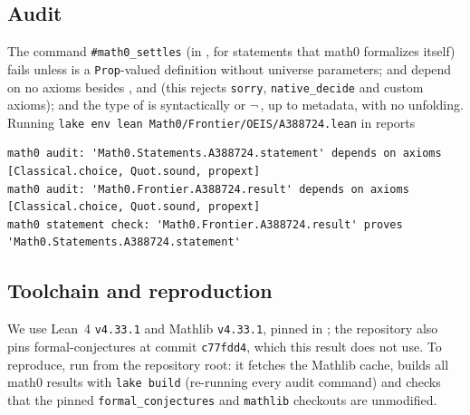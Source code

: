 \documentclass[11pt]{amsart}
\theoremstyle{plain}
\theoremstyle{definition}
\begin{document}
\subsection*{Audit}
The command \texttt{\#math0\_settles} (in , for statements that math0 formalizes itself) fails unless  is a \texttt{Prop}-valued definition without universe parameters;  and  depend on no axioms besides ,  and  (this rejects \texttt{sorry}, \texttt{native\_decide} and custom axioms); and the type of  is syntactically  or $\neg$\,, up to metadata, with no unfolding. Running \texttt{lake env lean Math0/Frontier/OEIS/A388724.lean} in  reports
\begin{lstlisting}[basicstyle=\ttfamily\scriptsize]
math0 audit: 'Math0.Statements.A388724.statement' depends on axioms [Classical.choice, Quot.sound, propext]
math0 audit: 'Math0.Frontier.A388724.result' depends on axioms [Classical.choice, Quot.sound, propext]
math0 statement check: 'Math0.Frontier.A388724.result' proves 'Math0.Statements.A388724.statement'
\end{lstlisting}

\subsection*{Toolchain and reproduction}
We use Lean~4 \cite{Lean4} \texttt{v4.33.1} and Mathlib \cite{Mathlib} \texttt{v4.33.1}, pinned in ; the repository also pins formal-conjectures \cite{FC} at commit \texttt{c77fdd4}, which this result does not use. To reproduce, run  from the repository root: it fetches the Mathlib cache, builds all math0 results with \texttt{lake build} (re-running every audit command) and checks that the pinned \texttt{formal\_conjectures} and \texttt{mathlib} checkouts are unmodified.
\end{document}
